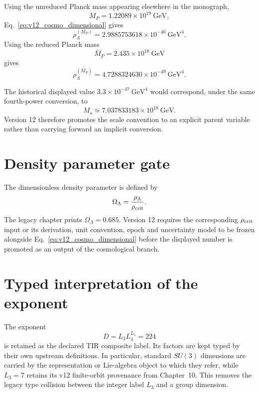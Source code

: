 Using the unreduced Planck mass appearing elsewhere in the monograph,
\begin{equation}
M_P=1.22089\times10^{19}\ \mathrm{GeV},
\end{equation}
Eq.~\eqref{eq:v12_cosmo_dimensional} gives
\begin{equation}
\rho_\Lambda^{(M_P)}
=2.9885753618\times10^{-46}\ \mathrm{GeV}^4.
\end{equation}
Using the reduced Planck mass
\begin{equation}
\bar M_P=2.435\times10^{18}\ \mathrm{GeV}
\end{equation}
gives
\begin{equation}
\rho_\Lambda^{(\bar M_P)}
=4.7288324630\times10^{-49}\ \mathrm{GeV}^4.
\end{equation}

The historical displayed value $3.3\times10^{-47}\ \mathrm{GeV}^4$ would correspond, under the same fourth-power conversion, to
\begin{equation}
M_\star\simeq7.037833183\times10^{18}\ \mathrm{GeV}.
\end{equation}
Version 12 therefore promotes the scale convention to an explicit parent variable rather than carrying forward an implicit conversion.

\section{Density parameter gate}

The dimensionless density parameter is defined by
\begin{equation}
\Omega_\Lambda=\frac{\rho_\Lambda}{\rho_{\rm crit}}.
\label{eq:v12_omega_lambda}
\end{equation}
The legacy chapter prints $\Omega_\Lambda=0.685$. Version 12 requires the corresponding $\rho_{\rm crit}$ input or its derivation, unit convention, epoch and uncertainty model to be frozen alongside Eq.~\eqref{eq:v12_cosmo_dimensional} before the displayed number is promoted as an output of the cosmological branch.

\section{Typed interpretation of the exponent}

The exponent
\begin{equation}
D=L_3L_4^{L_5}=224
\end{equation}
is retained as the declared TIR composite label. Its factors are kept typed by their own upstream definitions. In particular, standard $SU(3)$ dimensions are carried by the representation or Lie-algebra object to which they refer, while $L_3=7$ retains its v12 finite-orbit provenance from Chapter~10. This removes the legacy type collision between the integer label $L_3$ and a group dimension.

